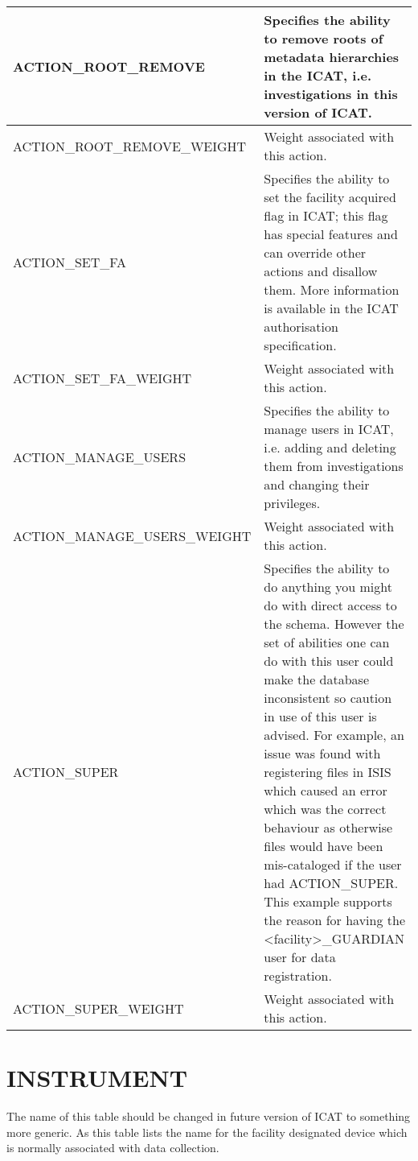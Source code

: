 \documentclass{report}
\begin{document}
\begin{tabular}{|l|l|}
ACTION\_ROOT\_REMOVE & \multicolumn{1}{p{100mm}|}{
Specifies the ability to remove roots of metadata hierarchies in the ICAT, i.e. investigations in this version of ICAT.} \\ \hline
ACTION\_ROOT\_REMOVE\_WEIGHT & \multicolumn{1}{p{100mm}|}{
Weight associated with this action.} \\ \hline
ACTION\_SET\_FA & \multicolumn{1}{p{100mm}|}{
Specifies the ability to set the facility acquired flag in ICAT; this flag has special features and can override other actions and disallow them. More information is available in the ICAT authorisation specification.} \\ \hline
ACTION\_SET\_FA\_WEIGHT & \multicolumn{1}{p{100mm}|}{
Weight associated with this action.} \\ \hline
ACTION\_MANAGE\_USERS & \multicolumn{1}{p{100mm}|}{
Specifies the ability to manage users in ICAT, i.e. adding and deleting them from investigations and changing their privileges.} \\ \hline
ACTION\_MANAGE\_USERS\_WEIGHT & \multicolumn{1}{p{100mm}|}{
Weight associated with this action.} \\ \hline
ACTION\_SUPER & \multicolumn{1}{p{100mm}|}{
Specifies the ability to do anything you might do with direct access to the schema. However the set of abilities one can do with this user could make the database inconsistent so caution in use of this user is advised. For example, an issue was found with registering files in ISIS which caused an error which was the correct behaviour as otherwise files would have been mis-cataloged if the user had ACTION\_SUPER. This example supports the reason for having the \textless{}facility\textgreater{}\_GUARDIAN user for data registration.} \\ \hline
ACTION\_SUPER\_WEIGHT & \multicolumn{1}{p{100mm}|}{
Weight associated with this action.} \\ \hline
\end{tabular}
\section{INSTRUMENT}

The name of this table should be changed in future version of ICAT to something more generic. As this table lists the name for the facility designated device which is normally associated with data collection.\\
\end{document}
